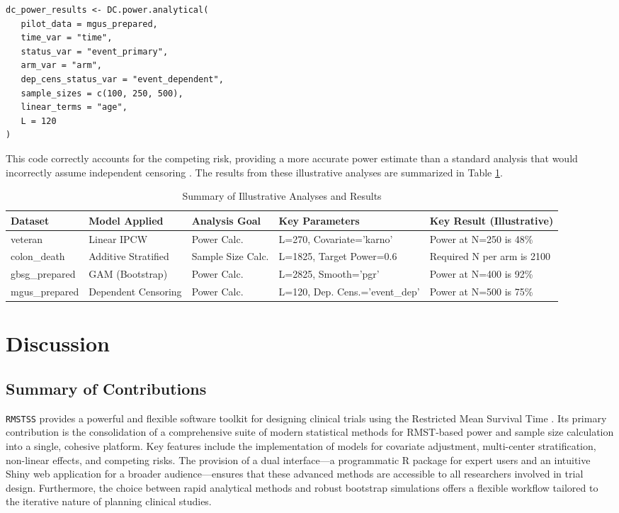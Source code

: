 \documentclass[11pt, a4paper]{article}
\begin{document}
\begin{lstlisting}
dc_power_results <- DC.power.analytical(
   pilot_data = mgus_prepared,
   time_var = "time",
   status_var = "event_primary",
   arm_var = "arm",
   dep_cens_status_var = "event_dependent",
   sample_sizes = c(100, 250, 500),
   linear_terms = "age",
   L = 120
)
\end{lstlisting}
This code correctly accounts for the competing risk, providing a more accurate power estimate than a standard analysis that would incorrectly assume independent censoring \cite{[1]}. The results from these illustrative analyses are summarized in Table \ref{tab:example_summary}.

\begin{table}[h!]
\centering
\caption{Summary of Illustrative Analyses and Results}
\label{tab:example_summary}
\begin{tabular}{@{}lllll@{}}
\toprule
\textbf{Dataset} & \textbf{Model Applied} & \textbf{Analysis Goal} & \textbf{Key Parameters} & \textbf{Key Result (Illustrative)} \\ \midrule
veteran & Linear IPCW & Power Calc. & L=270, Covariate='karno' & Power at N=250 is 48\% \\
colon\_death & Additive Stratified & Sample Size Calc. & L=1825, Target Power=0.6 & Required N per arm is 2100 \\
gbsg\_prepared & GAM (Bootstrap) & Power Calc. & L=2825, Smooth='pgr' & Power at N=400 is 92\% \\
mgus\_prepared & Dependent Censoring & Power Calc. & L=120, Dep. Cens.='event\_dep' & Power at N=500 is 75\% \\ \bottomrule
\end{tabular}
\end{table}

\section{Discussion}

\subsection{Summary of Contributions}
\texttt{RMSTSS} provides a powerful and flexible software toolkit for designing clinical trials using the Restricted Mean Survival Time \cite{[1]}. Its primary contribution is the consolidation of a comprehensive suite of modern statistical methods for RMST-based power and sample size calculation into a single, cohesive platform. Key features include the implementation of models for covariate adjustment, multi-center stratification, non-linear effects, and competing risks. The provision of a dual interface—a programmatic R package for expert users and an intuitive Shiny web application for a broader audience—ensures that these advanced methods are accessible to all researchers involved in trial design. Furthermore, the choice between rapid analytical methods and robust bootstrap simulations offers a flexible workflow tailored to the iterative nature of planning clinical studies.
\end{document}
